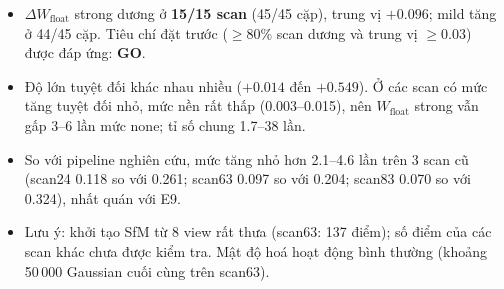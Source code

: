 \documentclass[11pt,a4paper]{article}
\newcommand{\W}{W_{\text{float}}}
\newcommand{\dW}{\Delta W_{\text{float}}}
\begin{document}
\begin{itemize}
  \item $\dW$ strong dương ở \textbf{15/15 scan} (45/45 cặp), trung vị $+0.096$; mild tăng ở 44/45 cặp. Tiêu chí đặt trước (\(\ge80\%\) scan dương và trung vị \(\ge0.03\)) được đáp ứng: \textbf{GO}.
  \item Độ lớn tuyệt đối khác nhau nhiều ($+0.014$ đến $+0.549$). Ở các scan có mức tăng tuyệt đối nhỏ, mức nền rất thấp (0.003--0.015), nên $\W$ strong vẫn gấp 3--6 lần mức none; tỉ số chung 1.7--38 lần.
  \item So với pipeline nghiên cứu, mức tăng nhỏ hơn 2.1--4.6 lần trên 3 scan cũ (scan24 0.118 so với 0.261; scan63 0.097 so với 0.204; scan83 0.070 so với 0.324), nhất quán với E9.
  \item Lưu ý: khởi tạo SfM từ 8 view rất thưa (scan63: 137 điểm); số điểm của các scan khác chưa được kiểm tra. Mật độ hoá hoạt động bình thường (khoảng 50\,000 Gaussian cuối cùng trên scan63).
\end{itemize}
\end{document}
